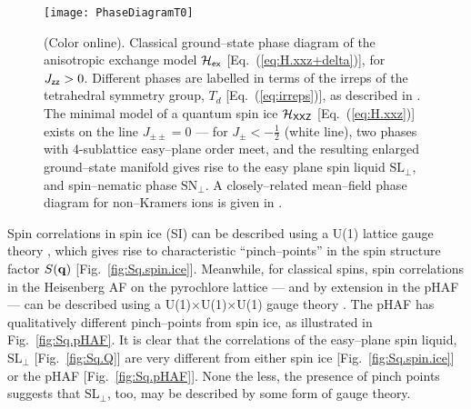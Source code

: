 \documentclass[apsrev4-1,prx,superscriptaddress,floatfix,twocolumn,longbibliography]{revtex4-1}
\begin{document}
\begin{figure}[t]
  \texttt{[image: PhaseDiagramT0]}
  \caption{(Color online).
  Classical ground--state phase diagram of the anisotropic exchange 
 model ${\mathcal H}_{\sf ex}$ [Eq.~(\ref{eq:H.xxz+delta})], for 
  $J_{\sf zz} > 0$.   
  Different phases are labelled in terms of the irreps of the tetrahedral 
  symmetry group, $T_d$ [Eq.~(\ref{eq:irreps})], as described in \cite{yan17}.  
  The minimal model of a quantum spin ice $\mathcal{H}_{\sf XXZ}$ 
  [Eq.~(\ref{eq:H.xxz})] exists on the line $J_{\pm\pm} = 0$
  --- for $J_\pm < -\frac{1}{2}$ (white line), two phases with 4-sublattice easy--plane order 
  meet, %
  and the resulting enlarged ground--state manifold gives rise to the 
  easy plane spin liquid $\text{SL}_\perp$, and spin--nematic phase $\text{SN}_\perp$.
   A closely--related mean--field phase diagram for non--Kramers ions 
   is given in  \cite{Onoda2011a, petit16-PRB94}.}
  \label{fig:phase.diagram-T=0}
\end{figure}


Spin correlations in spin ice (SI) can be described using a U(1) lattice 
gauge theory  \cite{henley05, isakov05,castelnovo12}, which gives rise to 
characteristic ``pinch--points'' in the spin structure factor $S({\bf q})$ [Fig.~\ref{fig:Sq.spin.ice}].   
%
Meanwhile, for classical spins, spin correlations in the Heisenberg AF  
on the pyrochlore lattice --- and by extension in the pHAF --- can be 
described using a U(1)$\times$U(1)$\times$U(1) gauge theory 
\cite{moessner98-PRL80, moessner98-PRB58,Isakov2004a,henley05}.
%
The pHAF has qualitatively different pinch--points from spin ice,
as illustrated in Fig.~\ref{fig:Sq.pHAF}. 
%
It is clear  that the correlations of the easy--plane spin liquid, $\text{SL}_\perp$
[Fig.~\ref{fig:Sq.Q}] are very different from either spin ice [Fig.~\ref{fig:Sq.spin.ice}]
or the pHAF [Fig.~\ref{fig:Sq.pHAF}].
%
None the less, the presence of pinch points suggests that $\text{SL}_\perp$, too, 
may be described by some form of gauge theory.

\end{document}
